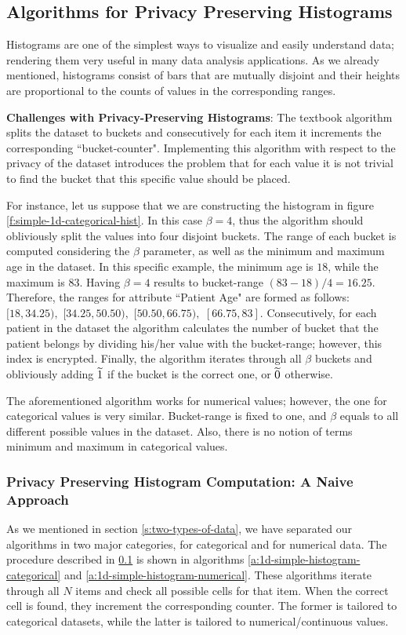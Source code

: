 \subsection{Algorithms for Privacy Preserving Histograms}\label{ss:histogram-algos}
Histograms are one of the simplest ways to visualize and easily understand data; rendering them very useful in many data analysis applications.
As we already mentioned, histograms consist of bars that are mutually disjoint and their heights are proportional to the counts of values in the corresponding ranges.

\textbf{Challenges with Privacy-Preserving Histograms}: The textbook algorithm splits the dataset to buckets and consecutively for each item it increments the corresponding ``bucket-counter".
Implementing this algorithm with respect to the privacy of the dataset introduces the problem that for each value it is not trivial to find the bucket that this specific value should be placed.

For instance, let us suppose that we are constructing the histogram in figure \ref{f:simple-1d-categorical-hist}.
In this case $\beta = 4$, thus the algorithm should obliviously split the values into four disjoint buckets.
The range of each bucket is computed considering the $\beta$ parameter, as well as the minimum and maximum age in the dataset.
In this specific example, the minimum age is $18$, while the maximum is $83$.
Having $\beta = 4$ results to bucket-range $(83 - 18) / 4 = 16.25$.
Therefore, the ranges for attribute ``Patient Age" are formed as follows: $[18, 34.25),$ $[34.25, 50.50),$ $[50.50, 66.75),$ $[66.75, 83]$.
Consecutively, for each patient in the dataset the algorithm calculates the number of bucket that the patient belongs by dividing his/her value with the bucket-range; however, this index is encrypted.
Finally, the algorithm iterates through all $\beta$ buckets and obliviously adding $\widetilde{1}$ if the bucket is the correct one, or $\widetilde{0}$ otherwise.

The aforementioned algorithm works for numerical values; however, the one for categorical values is very similar.
Bucket-range is fixed to one, and $\beta$ equals to all different possible values in the dataset.
Also, there is no notion of terms minimum and maximum in categorical values.


\subsubsection{Privacy Preserving Histogram Computation: A Naive Approach}\label{sss:histogram-simple}
As we mentioned in section \ref{s:two-types-of-data}, we have separated our algorithms in two major categories, for categorical and for numerical data.
The procedure described in \ref{ss:histogram-algos} is shown in algorithms \ref{a:1d-simple-histogram-categorical} and \ref{a:1d-simple-histogram-numerical}.
These algorithms iterate through all $N$ items and check all possible cells for that item.
When the correct cell is found, they increment the corresponding counter.
The former is tailored to categorical datasets, while the latter is tailored to numerical/continuous values.

